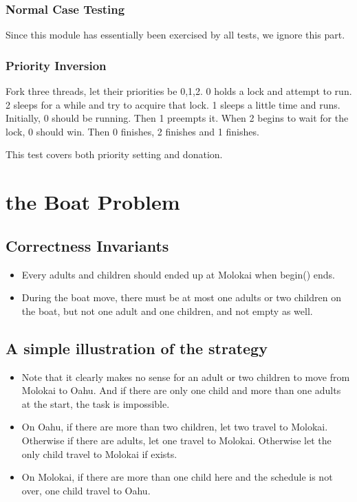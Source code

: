 \documentclass{article}
\begin{document}
	\subsubsection*{Normal Case Testing}
	Since this module has essentially been exercised by all tests, we ignore this part.
	
	\subsubsection*{Priority Inversion}
	Fork three threads, let their priorities be 0,1,2. 0 holds a lock and attempt to run. 2 sleeps for a while and try to acquire that lock. 1 sleeps a little time and runs. Initially, 0 should be running. Then 1 preempts it. When 2 begins to wait for the lock, 0 should win. Then 0 finishes, 2 finishes and 1 finishes.
	
	This test covers both priority setting and donation.
%	
	\section{the Boat Problem}
	
	\subsection{Correctness Invariants}
	
	\begin{itemize}
		\item Every adults and children should ended up at Molokai when begin() ends.
		
		\item During the boat move, there must be at most one adults or two children on the boat, but not one adult and one children, and not empty as well. 
	\end{itemize}
	
	\subsection{A simple illustration of the strategy}
	
	\begin{itemize}
		\item Note that it clearly makes no sense for an adult or two children to move from Molokai to Oahu. And if there are only one child and more than one adults at the start, the task is impossible.
		
		\item On Oahu, if there are more than two children, let two travel to Molokai. Otherwise if there are adults, let one travel to Molokai. Otherwise let the only child travel to Molokai if exists.
		
		\item On Molokai, if there are more than one child here and the schedule is not over, one child travel to Oahu.
	\end{itemize}
	
\end{document}
